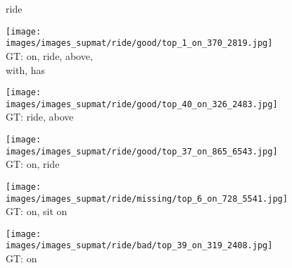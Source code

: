 \documentclass[10pt,twocolumn,letterpaper]{article}
\begin{document}
\begin{figure*}[t]
\begin{minipage}[t]{0.005\textwidth}
    	\centering
    	\vspace{-8.5ex}
    	\begin{turn}{90}
    	ride
    	\end{turn}
    	\vspace{2ex}
    \end{minipage}
    \hspace{0.01\textwidth}
\begin{minipage}[t]{0.18\textwidth}
    	\centering
       	\texttt{[image: images/images\_supmat/ride/good/top\_1\_on\_370\_2819.jpg]}\\
       	\vspace{0.3ex}
GT: on, ride, above,\\
       	with, has
       	\vspace{2ex}
    \end{minipage}
    \hspace{0.005\textwidth}
\begin{minipage}[t]{0.18\textwidth}
    	\centering
       	\texttt{[image: images/images\_supmat/ride/good/top\_40\_on\_326\_2483.jpg]}\\
       	\vspace{0.3ex}
GT: ride, above
       	\vspace{0.2ex}
    \end{minipage}
    \hspace{0.005\textwidth}
\begin{minipage}[t]{0.18\textwidth}
    	\centering
       	\texttt{[image: images/images\_supmat/ride/good/top\_37\_on\_865\_6543.jpg]}\\
       	\vspace{0.3ex}
GT: on, ride
       	\vspace{0.2ex}
    \end{minipage}
    \hspace{0.005\textwidth}  
\begin{minipage}[t]{0.18\textwidth}
    	\centering
       	\texttt{[image: images/images\_supmat/ride/missing/top\_6\_on\_728\_5541.jpg]}\\
       	\vspace{0.3ex}
GT: on, sit on
       	\vspace{0.2ex}
    \end{minipage}
    \hspace{0.005\textwidth}  
\begin{minipage}[t]{0.18\textwidth}
    	\centering
       	\texttt{[image: images/images\_supmat/ride/bad/top\_39\_on\_319\_2408.jpg]}\\
       	\vspace{0.3ex}
GT: on
      	\vspace{0.2ex}
    \end{minipage} 



\end{figure*}
\end{document}
